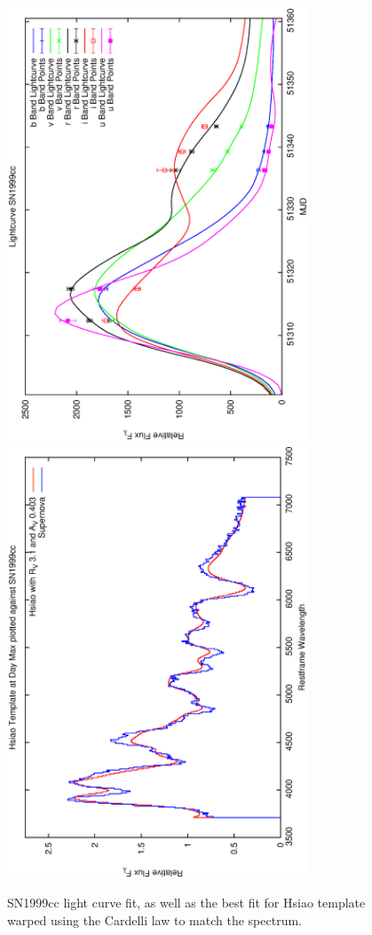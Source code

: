\clearpage

\begin{figure}[p]
\centering
\includegraphics[angle=-90,width=0.8\textwidth]{./figures/ltcv/SN1999cc_v027_lightcurve.ps}
\hfill
\includegraphics[angle=-90,width=0.8\textwidth]{./figures/hsiao/SN1999cc_v001_hsiao.ps}
\hfill
\caption{SN1999cc light curve fit, as well as the best fit for Hsiao template warped using the Cardelli law to match the spectrum.}
\label{fig:SN1999ccfour2}
\end{figure}

